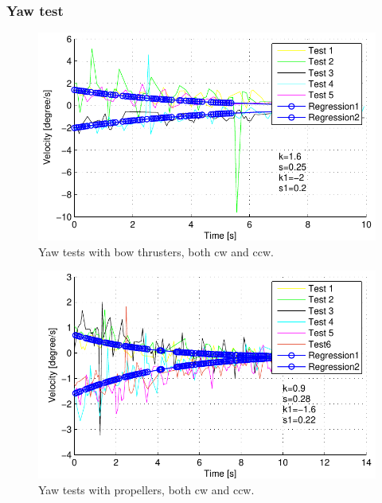 \subsubsection{Yaw test}
\begin{figure}[H]
	\centering
	\includegraphics{plot/yawcoeffsbow}
	\caption{Yaw tests with bow thrusters, both cw and ccw.}
	\label{fig:yaw1}
\end{figure}
\begin{figure}[H]
	\centering
	\includegraphics{plot/yawcoeffspropellor}
	\caption{Yaw tests with propellers, both cw and ccw.}
	\label{fig:yaw2}
\end{figure}

\newpage
